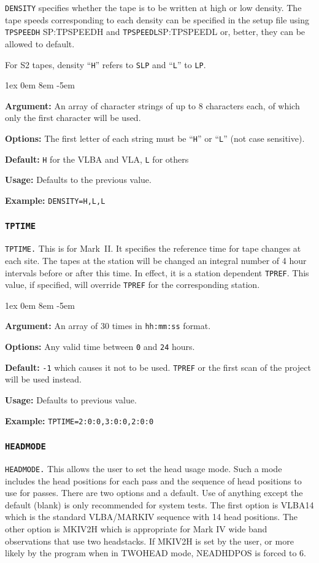 \documentclass{report}
\newcommand{\rcwbox}[5]{
  \begin{list}{}{\parsep 1ex  \itemsep 0em
                 \leftmargin 8em  \itemindent -5em }
    \item {\bf Argument:} #1
    \item {\bf Options:}  #2
    \item {\bf Default:}  #3
    \item {\bf Usage:}    #4
    \item {\bf Example:}  #5
  \end{list}
}
\begin{document}
{\tt DENSITY} specifies whether the tape is to be written at
high or low density.  The tape speeds corresponding to each density
can be specified in the setup file using {\tt TPSPEEDH} {SP:TPSPEEDH}
and {\tt TPSPEEDL}{SP:TPSPEEDL} or, better, they can be allowed to
default.

For S2 tapes, density ``{\tt H}'' refers to {\tt SLP} and ``{\tt L}''
to {\tt LP}.

\rcwbox
{An array of character strings of up to 8 characters each, of which
only the first character will be used.}
{The first letter of each string must be ``{\tt H}'' or ``{\tt L}''
(not case sensitive).}
{{\tt H} for the VLBA and VLA, {\tt L} for others}
{Defaults to the previous value.}
{{\tt DENSITY=H,L,L}}

\subsubsection{\label{TP:TPTIME}{\tt TPTIME}}

{\tt TPTIME.} This is for Mark~II. It specifies the reference
time for tape changes at each  site. The tapes at the station will be
changed an integral number of 4 hour intervals before or after this
time. In effect, it is a station dependent {\tt TPREF}. This value, if
specified, will override {\tt TPREF} for the corresponding station.

\rcwbox
{An array of 30 times in {\tt hh:mm:ss} format.}
{Any valid time between {\tt 0} and {\tt 24} hours.}
{{\tt -1} which causes it not to be used. {\tt TPREF} or the first
scan of the project will be used instead.}
{Defaults to previous value.}
{{\tt TPTIME=2:0:0,3:0:0,2:0:0}}

\subsubsection{\label{TP:HEADMODE}{\tt HEADMODE}}

{\tt HEADMODE.}  This allows the user to set the head usage mode.
Such a mode includes the head positions for each pass and the
sequence of head positions to use for passes.  There are two options
and a default.  Use of anything except the default (blank) is only recommended
for system tests.  The first option is VLBA14 which is the standard
VLBA/MARKIV sequence with 14 head positions.  The other option is
MKIV2H which is appropriate for Mark IV wide band observations that
use two headstacks.  If MKIV2H is set by the user, or more likely by
the program when in TWOHEAD mode, NEADHDPOS is forced to 6.
\end{document}
